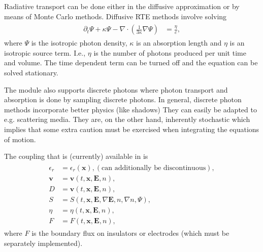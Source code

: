 \documentclass[letterpaper,10pt,english]{sphinxmanual}
\begin{document}
Radiative transport can be done either in the diffusive approximation or by means of Monte Carlo methods.
Diffusive RTE methods involve solving
\begin{equation*}
\begin{split}\begin{align}
   \partial_t\Psi + \kappa\Psi - \nabla\cdot\left(\frac{1}{3\kappa}\nabla\Psi\right) &= \frac{\eta}{c},
\end{align}\end{split}
\end{equation*}
where \(\Psi\) is the isotropic photon density, \(\kappa\) is an absorption length and \(\eta\) is an isotropic source term.
I.e., \(\eta\) is the number of photons produced per unit time and volume.
The time dependent term can be turned off and the equation can be solved stationary.

The module also supports discrete photons where photon transport and absorption is done by sampling discrete photons.
In general, discrete photon methods incorporate better physics (like shadows)
They can easily be adapted to e.g. scattering media.
They are, on the other hand, inherently stochastic which implies that some extra caution must be exercised when integrating the equations of motion.

The coupling that is (currently) available in  is
\begin{equation}\label{equation:Applications/CdrPlasmaModel:CdrPlasmaCoupling}
\begin{split}\begin{align}
   \epsilon_r &= \epsilon_r(\mathbf{x}), (\textrm{can additionally be discontinuous}), \\[1ex]
   \mathbf{v} &= \mathbf{v}\left(t, \mathbf{x}, \mathbf{E}, n\right), \\[1ex]
   D &= \mathbf{v}\left(t, \mathbf{x}, \mathbf{E}, n\right), \\[1ex]
   S &= S\left(t, \mathbf{x}, \mathbf{E}, \nabla\mathbf{E}, n, \nabla n, \Psi\right), \\[1ex]
   \eta &= \eta\left(t, \mathbf{x}, \mathbf{E}, n\right), \\[1ex]
   F &= F(t, \mathbf{x}, \mathbf{E}, n),
\end{align}\end{split}
\end{equation}
where \(F\) is the boundary flux on insulators or electrodes (which must be separately implemented).
\end{document}
